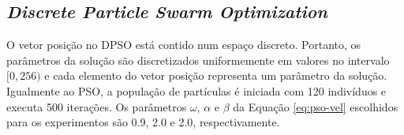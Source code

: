 \subsection{\textit{Discrete Particle Swarm Optimization}}

O vetor posição no DPSO está contido num espaço discreto. Portanto, os parâmetros da solução são discretizados uniformemente em valores no intervalo $[0, 256)$ e cada elemento do vetor posição representa um parâmetro da solução. Igualmente ao PSO, a população de partículas é iniciada com 120 indivíduos e executa 500 iterações. Os parâmetros $\omega$, $\alpha$ e $\beta$ da Equação \ref{eq:pso-vel} escolhidos para os experimentos são 0.9, 2.0 e 2.0, respectivamente.


